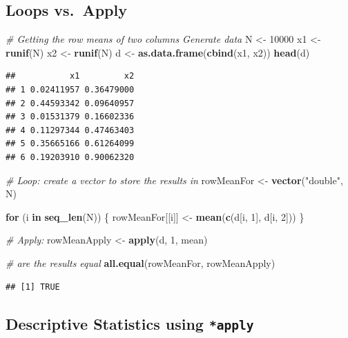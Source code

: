 \documentclass[]{book}
\makeatletter
\newenvironment{Shaded}{\begin{snugshade}}{\end{snugshade}}
\newcommand{\KeywordTok}[1]{\textcolor[rgb]{0.13,0.29,0.53}{\textbf{#1}}}
\newcommand{\DecValTok}[1]{\textcolor[rgb]{0.00,0.00,0.81}{#1}}
\newcommand{\StringTok}[1]{\textcolor[rgb]{0.31,0.60,0.02}{#1}}
\newcommand{\CommentTok}[1]{\textcolor[rgb]{0.56,0.35,0.01}{\textit{#1}}}
\newcommand{\ControlFlowTok}[1]{\textcolor[rgb]{0.13,0.29,0.53}{\textbf{#1}}}
\newcommand{\NormalTok}[1]{#1}
\newenvironment{kframe}{%
\medskip{}
\setlength{\fboxsep}{.8em}
 \def\at@end@of@kframe{}%
 \ifinner\ifhmode%
  \def\at@end@of@kframe{\end{minipage}}%
  \begin{minipage}{\columnwidth}%
 \fi\fi%
 \def\FrameCommand##1{\hskip\@totalleftmargin \hskip-\fboxsep
 \colorbox{shadecolor}{##1}\hskip-\fboxsep
     \hskip-\linewidth \hskip-\@totalleftmargin \hskip\columnwidth}%
 \MakeFramed {\advance\hsize-\width
   \@totalleftmargin\z@ \linewidth\hsize
   \@setminipage}}%
 {\par\unskip\endMakeFramed%
 \at@end@of@kframe}
\renewenvironment{Shaded}{\begin{kframe}}{\end{kframe}}
\theoremstyle{definition}
\theoremstyle{definition}
\theoremstyle{definition}
\theoremstyle{remark}
\makeatother
\begin{document}
\subsection{Loops vs.~Apply}\label{loops-vs.apply}

\begin{Shaded}
\begin{Highlighting}[]
\CommentTok{# Getting the row means of two columns Generate data}
\NormalTok{N <-}\StringTok{ }\DecValTok{10000}
\NormalTok{x1 <-}\StringTok{ }\KeywordTok{runif}\NormalTok{(N)}
\NormalTok{x2 <-}\StringTok{ }\KeywordTok{runif}\NormalTok{(N)}
\NormalTok{d <-}\StringTok{ }\KeywordTok{as.data.frame}\NormalTok{(}\KeywordTok{cbind}\NormalTok{(x1, x2))}
\KeywordTok{head}\NormalTok{(d)}
\end{Highlighting}
\end{Shaded}

\begin{verbatim}
##           x1         x2
## 1 0.02411957 0.36479000
## 2 0.44593342 0.09640957
## 3 0.01531379 0.16602336
## 4 0.11297344 0.47463403
## 5 0.35665166 0.61264099
## 6 0.19203910 0.90062320
\end{verbatim}

\begin{Shaded}
\begin{Highlighting}[]
\CommentTok{# Loop: create a vector to store the results in}
\NormalTok{rowMeanFor <-}\StringTok{ }\KeywordTok{vector}\NormalTok{(}\StringTok{"double"}\NormalTok{, N)}

\ControlFlowTok{for}\NormalTok{ (i }\ControlFlowTok{in} \KeywordTok{seq_len}\NormalTok{(N)) \{}
\NormalTok{    rowMeanFor[[i]] <-}\StringTok{ }\KeywordTok{mean}\NormalTok{(}\KeywordTok{c}\NormalTok{(d[i, }\DecValTok{1}\NormalTok{], d[i, }\DecValTok{2}\NormalTok{]))}
\NormalTok{\}}

\CommentTok{# Apply:}
\NormalTok{rowMeanApply <-}\StringTok{ }\KeywordTok{apply}\NormalTok{(d, }\DecValTok{1}\NormalTok{, mean)}

\CommentTok{# are the results equal}
\KeywordTok{all.equal}\NormalTok{(rowMeanFor, rowMeanApply)}
\end{Highlighting}
\end{Shaded}

\begin{verbatim}
## [1] TRUE
\end{verbatim}

\subsection{\texorpdfstring{Descriptive Statistics using
\texttt{*apply}}{Descriptive Statistics using *apply}}\label{descriptive-statistics-using-apply}
\end{document}
